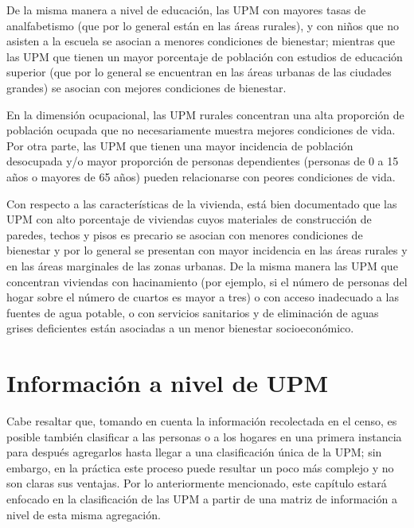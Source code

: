 \documentclass[
  12pt,
  spanish,
]{book}
\begin{document}
De la misma manera a nivel de educación, las UPM con mayores tasas de analfabetismo (que por lo general están en las áreas rurales), y con niños que no asisten a la escuela se asocian a menores condiciones de bienestar; mientras que las UPM que tienen un mayor porcentaje de población con estudios de educación superior (que por lo general se encuentran en las áreas urbanas de las ciudades grandes) se asocian con mejores condiciones de bienestar.

En la dimensión ocupacional, las UPM rurales concentran una alta proporción de población ocupada que no necesariamente muestra mejores condiciones de vida. Por otra parte, las UPM que tienen una mayor incidencia de población desocupada y/o mayor proporción de personas dependientes (personas de 0 a 15 años o mayores de 65 años) pueden relacionarse con peores condiciones de vida.

Con respecto a las características de la vivienda, está bien documentado que las UPM con alto porcentaje de viviendas cuyos materiales de construcción de paredes, techos y pisos es precario se asocian con menores condiciones de bienestar y por lo general se presentan con mayor incidencia en las áreas rurales y en las áreas marginales de las zonas urbanas. De la misma manera las UPM que concentran viviendas con hacinamiento (por ejemplo, si el número de personas del hogar sobre el número de cuartos es mayor a tres) o con acceso inadecuado a las fuentes de agua potable, o con servicios sanitarios y de eliminación de aguas grises deficientes están asociadas a un menor bienestar socioeconómico.

\hypertarget{informaciuxf3n-a-nivel-de-upm}{%
\section{Información a nivel de UPM}\label{informaciuxf3n-a-nivel-de-upm}}

Cabe resaltar que, tomando en cuenta la información recolectada en el censo, es posible también clasificar a las personas o a los hogares en una primera instancia para después agregarlos hasta llegar a una clasificación única de la UPM; sin embargo, en la práctica este proceso puede resultar un poco más complejo y no son claras sus ventajas. Por lo anteriormente mencionado, este capítulo estará enfocado en la clasificación de las UPM a partir de una matriz de información a nivel de esta misma agregación.
\end{document}
